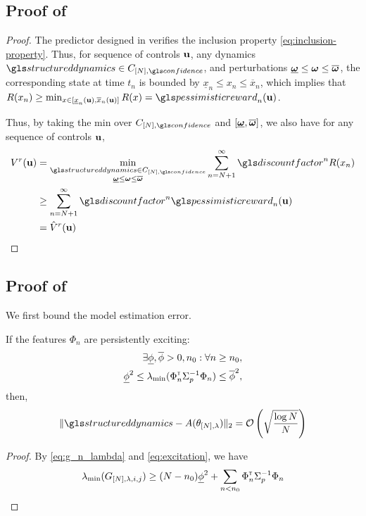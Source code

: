 \begin{subappendices}
	
	\subsection{Proof of }
	
	\begin{proof}
		The predictor designed in  verifies the inclusion property \eqref{eq:inclusion-property}. Thus, for sequence of controls $\mathbf{u}$, any dynamics $\structureddynamics\in C_{[N],\confidence}$, and perturbations $\underline{\bm{\omega}} \leq \bm{\omega} \leq \overline{\bm{\omega}}$, the corresponding state at time $t_n$ is bounded by $\underline{x}_n \leq x_n \leq \overline{x}_n$, which implies that $R(x_n) \geq \min_{x\in[\underline{x}_n(\bu), \overline{x}_n(\bu)]}  R(x) = \pessimisticreward_n(\bu)$.
		
		Thus, by taking the min over $C_{[N],\confidence}$ and $[\underline{\bm{\omega}}, \overline{\bm{\omega}}]$, we also have for any sequence of controls $\mathbf{u}$,
		\begin{align*}
		V^r(\bu) &= \min_{\substack{\structureddynamics\in C_{[N],\confidence}\\ \underline{\bom} \leq \bom \leq \overline{\bom}}} \sum_{n=N+1}^\infty \discount^n R(x_n)\\
		&\geq \sum_{n=N+1}^\infty \discount^n \pessimisticreward_n(\bu)\\
		&= \hat{V}^r(\bu)
		\end{align*}
	\end{proof}
	
	\subsection{Proof of }
	
	We first bound the model estimation error.
	\begin{lemma}
		\begin{leftbar}[lemmabar]
		If the features $\Phi_n$ are persistently exciting:
		\begin{align}
		\label{eq:excitation}
		\exists \underline{\phi},\overline{\phi}>0, n_0: \forall n\geq n_0,\nonumber\\ \underline{\phi}^2 \leq \lambda_{\min}(\Phi_{n}^{\mathsf{\scriptscriptstyle T}}\Sigma_{p}^{-1}\Phi_{n}) \leq \overline{\phi}^2,
		\end{align}
		then,
		\[\|\structureddynamics - A(\theta_{[N],\lambda})\|_2 = \cO\left( \sqrt{\frac{\log N}{N}} \right) \]
	\end{leftbar}
	\end{lemma}
	\begin{proof}
		By \eqref{eq:g_n_lambda} and \eqref{eq:excitation}, we have $$\lambda_{\min}(G_{[N],\lambda,i,j}) \geq (N-n_0)\underline{\phi}^2 + \sum_{n<n_0}\Phi_{n}^{\mathsf{\scriptscriptstyle T}}\Sigma_{p}^{-1}\Phi_{n}$$
		

\end{proof}
\end{subappendices}
